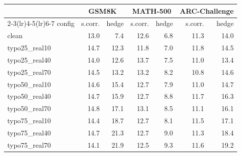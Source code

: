 \begin{tabular}{l rr rr rr}
\toprule
 & \multicolumn{2}{c}{GSM8K} & \multicolumn{2}{c}{MATH-500} & \multicolumn{2}{c}{ARC-Challenge} \\
\cmidrule(lr){2-3}\cmidrule(lr){4-5}\cmidrule(lr){6-7}
config & s.corr. & hedge & s.corr. & hedge & s.corr. & hedge \\
\midrule
clean & 13.0 & 7.4 & 12.6 & 6.8 & 11.3 & 14.0 \\
typo25\_real10 & 14.7 & 12.3 & 11.8 & 7.0 & 11.8 & 14.5 \\
typo25\_real40 & 14.0 & 12.6 & 13.7 & 7.5 & 11.0 & 13.4 \\
typo25\_real70 & 14.5 & 13.2 & 13.2 & 8.2 & 10.8 & 14.6 \\
typo50\_real10 & 14.6 & 15.4 & 12.7 & 7.9 & 11.0 & 14.7 \\
typo50\_real40 & 14.7 & 15.9 & 12.7 & 8.8 & 11.7 & 16.3 \\
typo50\_real70 & 14.8 & 17.1 & 13.1 & 8.5 & 11.1 & 16.1 \\
typo75\_real10 & 14.4 & 18.7 & 12.7 & 8.1 & 11.5 & 17.1 \\
typo75\_real40 & 14.7 & 21.3 & 12.7 & 9.0 & 11.3 & 18.4 \\
typo75\_real70 & 14.1 & 21.9 & 12.5 & 9.3 & 11.6 & 19.2 \\
\bottomrule
\end{tabular}
